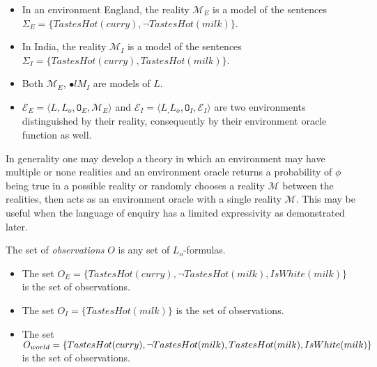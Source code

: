 \begin{exmp}
\begin{itemize}
\item In an environment England, the reality $\mathcal{M}_E$ is a model of the sentences\\ $\Sigma_E=\{TastesHot(curry), \neg TastesHot(milk)\}$.
\item In India, the reality $\mathcal{M}_I$ is a model of the sentences\\ $\Sigma_I=\{TastesHot(curry), TastesHot(milk)\}$.
\item Both $\mathcal{M}_E$, $\mathcal{•}l{M}_I$ are models of $L$.
\item $\mathcal{E}_E=\langle L, L_o, \mathtt{O}_E, \mathcal{M}_E \rangle$ and
$\mathcal{E}_I=\langle L_, L_o, \mathtt{O}_I, \mathcal{E}_I \rangle$ are two environments distinguished by their reality, consequently by their environment oracle function as well.
\end{itemize}
\end{exmp}

\begin{remark}
In generality one may develop a theory in which an environment may have multiple or none realities and an environment oracle returns a probability of $\phi$ being true in a possible reality or randomly chooses a reality $\mathcal{M}$ between the realities, then acts as an environment oracle with a single reality $\mathcal{M}$. This may be useful when the language of enquiry has a limited expressivity as demonstrated later.
\end{remark}

\begin{defn}
The set of \emph{observations} $O$ is any set of $L_o$-formulas.
\end{defn}

\begin{exmp}
\begin{itemize}
\item The set $O_E=\{TastesHot(curry), \neg TastesHot(milk), IsWhite(milk)\}$ is the set of observations.
\item The set $O_I=\{TastesHot(milk)\}$ is the set of observations.
\item The set $O_{world}=\{TastesHot(curry), \neg TastesHot(milk), TastesHot(milk), \\
IsWhite(milk)\}$ is the set of observations.
\end{itemize}
\end{exmp}


